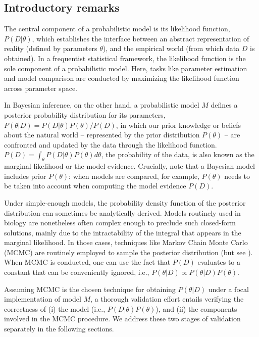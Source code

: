 \documentclass[oneside]{article}
\begin{document}
\subsection*{Introductory remarks}

The central component of a probabilistic model is its likelihood
function, $P(D|\theta)$, which establishes the
interface between an abstract representation of reality (defined by parameters $\theta$), and the
empirical world (from which data $D$ is obtained).
In a frequentist statistical framework, the likelihood function is the sole
component of a probabilistic model.
Here, tasks like parameter estimation and model comparison are conducted
by maximizing the likelihood function across parameter
space.

In Bayesian inference, on the other hand, a probabilistic model $M$
defines a posterior probability distribution for its parameters,
$P(\theta|D) = P(D|\theta)P(\theta) / P(D)$, in which our prior
knowledge or beliefs about the natural world -- represented by the prior
distribution $P(\theta)$ -- are confronted and updated by the data through the
likelihood function.
$P(D) = \int_\theta P(D|\theta)P(\theta)d\theta$, the probability of
the data, is also known as the marginal likelihood or the model
evidence.
Crucially, note that a Bayesian model includes prior $P(\theta)$:
when models are compared, for example, $P(\theta)$ needs to be taken
into account when computing the model evidence $P(D)$.

Under simple-enough models, the probability density function of the posterior distribution can sometimes be analytically
derived.
Models routinely used in biology are nonetheless often complex enough
to preclude such closed-form solutions, mainly due to the
intractability of the integral that appears in the marginal
likelihood.
In those cases, techniques like Markov Chain Monte Carlo (MCMC) are
routinely employed to sample the posterior distribution (but see \citealt{hmc,zhang18}).
When MCMC is conducted, one can use the fact that $P(D)$
evaluates to a constant that can be conveniently ignored, i.e., $P(\theta|D) \propto P(\theta|D)P(\theta)$.

Assuming MCMC is the chosen technique for obtaining $P(\theta|D)$
under a focal implementation of model $M$,
a thorough validation effort entails verifying the
correctness of (i) the model (i.e., $P(D|\theta)P(\theta)$), and (ii)
the components involved in the MCMC procedure.
We address these two stages of validation separately in the following sections.
\end{document}
